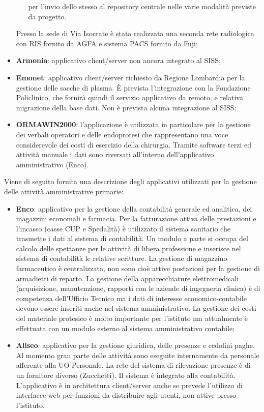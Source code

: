 \documentclass[12pt, a4paper, titlepage]{report}
\begin{document}
\begin{itemize}
\begin{enumerate}
			per l'invio dello stesso al repository centrale nelle varie modalità previste da progetto.
			\end{enumerate}
		Presso la sede di Via Isocrate è stata realizzata una seconda rete radiologica con RIS fornito da AGFA e sistema PACS fornito da Fuji;
		\item \textbf{Armonia}: applicativo client/server non ancora integrato al SISS;
		\item \textbf{Emonet}: applicativo client/server richiesto da Regione Lombardia per la gestione delle sacche di plasma. È prevista l'integrazione con la Fondazione Policlinico, che fornirà quindi il servizio applicativo da remoto, e relativa migrazione della base dati. Non è prevista alcuna integrazione al SISS;
		\item \textbf{ORMAWIN2000}: l'applicazione è utilizzata in particolare per la gestione dei verbali operatori e delle endoprotesi che rappresentano una voce considerevole dei costi di esercizio della chirurgia. Tramite software terzi ed attività manuale i dati sono riversati all'interno dell'applicativo amministrativo (Enco).
	\end{itemize}
	Viene di seguito fornita una descrizione degli applicativi utilizzati per la gestione delle attività amministrative primarie:
	
	\begin{itemize}
		\item \textbf{Enco}: applicativo per la gestione della contabilità generale ed analitica, dei magazzini economali e farmacia. Per la fatturazione attiva delle prestazioni e l'incasso (casse CUP e Spedalità) è utilizzato il sistema sanitario che trasmette i dati al sistema di contabilità. Un modulo a parte si occupa del calcolo delle spettanze per le attività di libera professione e inserisce nel sistema di contabilità le relative scritture. La gestione di
		magazzino farmaceutico è centralizzata, non sono cioè attive postazioni per la gestione di armadietti di reparto. La gestione della apparecchiature elettromedicali (acquisizione, manutenzione, rapporti con le aziende di ingegneria clinica) è di competenza dell’Ufficio Tecnico ma i dati di interesse economico-contabile devono essere inseriti anche nel sistema amministrativo. La gestione dei costi del materiale protesico è molto importante per l'istituto ma attualmente è effettuata con un modulo esterno al sistema amministrativo contabile;
		\item \textbf{Aliseo}: applicativo per la gestione giuridica, delle presenze e cedolini paghe.
		Al momento gran parte delle attività sono eseguite internamente da personale afferente alla UO Personale. La rete del sistema di rilevazione presenze è di un fornitore diverso (Zucchetti). Il sistema è integrato alla contabilità. L'applicativo è in architettura client/server anche se prevede l'utilizzo di interfacce web per funzioni da distribuire agli utenti, non attive presso l'istituto.
	\end{itemize}
	
\end{document}
